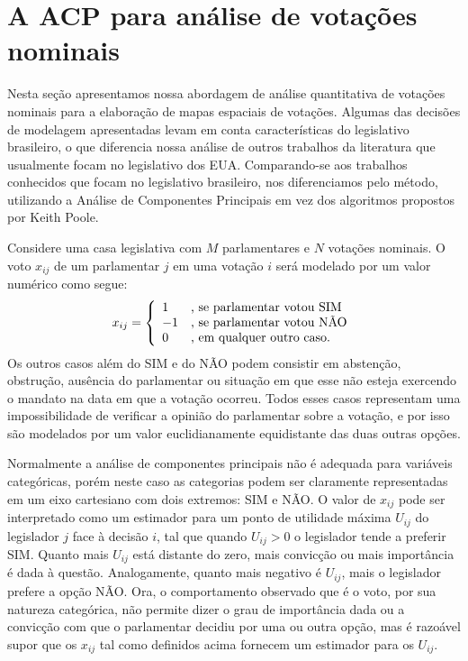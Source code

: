 \documentclass[
	article,			%
	12pt,				%
	oneside,			%
	a4paper,			%
	english,			%
	brazil,				%
	sumario=tradicional,
	oldfontcommands %
	]{abntex2}
\newcommand\nay{NÃO\xspace}
\newcommand\yea{SIM\xspace}
\begin{document}

\section{A ACP para análise de votações nominais}
\label{sec:acp}

Nesta seção apresentamos nossa abordagem de análise quantitativa de votações nominais para a elaboração de mapas espaciais de votações. Algumas das decisões de modelagem apresentadas levam em conta características do legislativo brasileiro, o que diferencia nossa análise de outros trabalhos da literatura que usualmente focam no legislativo dos EUA. Comparando-se aos trabalhos conhecidos que focam no legislativo brasileiro, nos diferenciamos pelo método, utilizando a Análise de Componentes Principais em vez dos algoritmos propostos por Keith Poole.

Considere uma casa legislativa com $M$ parlamentares e $N$ votações nominais. O voto $x_{ij}$ de um parlamentar $j$ em uma votação $i$ será modelado por um valor numérico como segue:
\[
   x_{ij} = \left\{ 
     \begin{array}{l l}
        1 & \text{, se parlamentar votou \yea} \\
       -1 & \text{, se parlamentar votou \nay} \\
        0 & \text{, em qualquer outro caso.} 
     \end{array} \right.
\]
Os outros casos além do \yea e do \nay podem consistir em abstenção, obstrução, ausência do parlamentar ou situação em que esse não esteja exercendo o mandato na data em que a votação ocorreu. Todos esses casos representam uma impossibilidade de verificar a opinião do parlamentar sobre a votação, e por isso são modelados por um valor euclidianamente equidistante das duas outras opções.

Normalmente a análise de componentes principais não é adequada para variáveis categóricas, porém neste caso as categorias podem ser claramente representadas em um eixo cartesiano com dois extremos: SIM e NÃO. O valor de $x_{ij}$ pode ser interpretado como um estimador para um ponto de utilidade máxima $U_{ij}$ do legislador $j$ face à decisão $i$, tal que quando $U_{ij} > 0$ o legislador tende a preferir \yea. Quanto mais $U_{ij}$ está distante do zero, mais convicção ou mais importância é dada à questão. Analogamente, quanto mais negativo é $U_{ij}$, mais o legislador prefere a opção \nay. Ora, o comportamento observado que é o voto, por sua natureza categórica, não permite dizer o grau de importância dada ou a convicção com que o parlamentar decidiu por uma ou outra opção, mas é razoável supor que os $x_{ij}$ tal como definidos acima fornecem um estimador para os $U_{ij}$.
\end{document}
